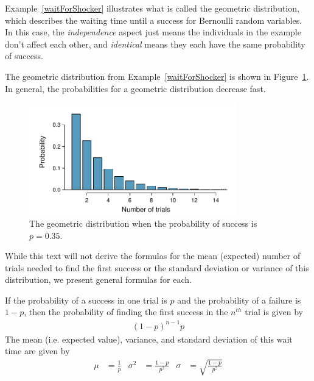 Example~\ref{waitForShocker} illustrates what is called the geometric distribution, which describes the waiting time until a success for  Bernoulli random variables. In this case, the \emph{independence} aspect just means the individuals in the example don't affect each other, and \emph{identical} means they each have the same probability of success.

The geometric distribution from Example~\ref{waitForShocker} is shown in Figure~\ref{geometricDist35}. In general, the probabilities for a geometric distribution decrease  fast.

\begin{figure}
\centering
\includegraphics[width=0.8\textwidth]{ch_distributions/figures/geometricDist35/geometricDist35}
\caption{The geometric distribution when the probability of success is $p=0.35$.}
\label{geometricDist35}
\end{figure}

While this text will not derive the formulas for the mean (expected) number of trials needed to find the first success or the standard deviation or variance of this distribution, we present general formulas for each.

\begin{termBox}{
If the probability of a success in one trial is $p$ and the probability of a failure is $1-p$, then the probability of finding the first success in the $n^{th}$ trial is given by\vspace{-1.5mm}
\begin{eqnarray}
(1-p)^{n-1}p
\end{eqnarray}
The mean (i.e. expected value), variance, and standard deviation of this wait time are given by\vspace{-2.5mm}
\begin{align}
\mu &= \frac{1}{p}
	&\sigma^2&=\frac{1-p}{p^2}
	&\sigma &= \sqrt{\frac{1-p}{p^2}}
\label{geomFormulas}
\end{align}}
\end{termBox}

